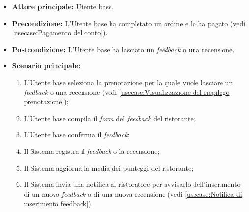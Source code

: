 \label{usecase:Inserimento di feedback e recensioni}
\begin{itemize}
	\item \textbf{Attore principale:} Utente base.

	\item \textbf{Precondizione:} L'Utente base ha completato un ordine e lo ha pagato (vedi \autoref{usecase:Pagamento del conto}).

	\item \textbf{Postcondizione:} L'Utente base ha lasciato un \textit{feedback} o una recensione.

	\item \textbf{Scenario principale:}
	      \begin{enumerate}
		      \item L'Utente base seleziona la prenotazione per la quale vuole
		            lasciare un \textit{feedback} o una recensione (vedi
		            \autoref{usecase:Visualizzazione del riepilogo prenotazione});

		      \item L'Utente base compila il \textit{form} del \textit{feedback} del ristorante;

		      \item L'Utente base conferma il \textit{feedback};

		      \item Il Sistema registra il \textit{feedback} o la recensione;

		      \item Il Sistema aggiorna la media dei punteggi del ristorante;

		      \item Il Sistema invia una notifica al ristoratore per avvisarlo
		            dell'inserimento di un nuovo \textit{feedback} o di una nuova
		            recensione (vedi \autoref{usecase:Notifica di inserimento feedback}).
	      \end{enumerate}
\end{itemize}
